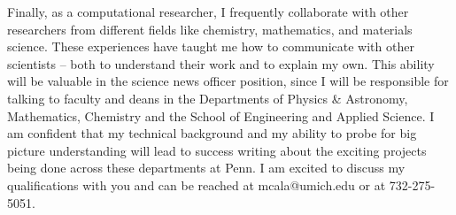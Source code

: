 Finally, as a computational researcher, I frequently collaborate with other researchers from different fields like chemistry, mathematics, and materials science. These experiences have taught me how to communicate with other scientists -- both to understand their work and to explain my own.  This ability will be valuable in the science news officer position, since I will be responsible for talking to faculty and deans in the Departments of Physics \& Astronomy, Mathematics, Chemistry and the School of Engineering and Applied Science. I am confident that my technical background and my ability to probe for big picture understanding will lead to success writing about the exciting projects being done across these departments at Penn. I am excited to discuss my qualifications with you and can be reached at mcala@umich.edu or at 732-275-5051.

\makeletterclosing
